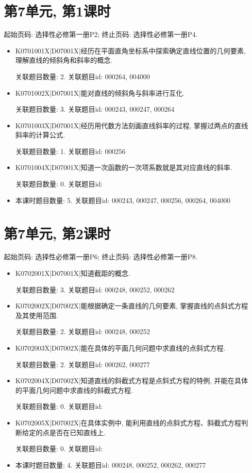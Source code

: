 \section*{第7单元, 第1课时}
起始页码: 选择性必修第一册P2; 终止页码: 选择性必修第一册P4.
\begin{itemize}
\item K0701001X|D07001X|经历在平面直角坐标系中探索确定直线位置的几何要素, 理解直线的倾斜角和斜率的概念.

关联题目数量: 2. 关联题目id: 000264, 004000

\item K0701002X|D07001X|能对直线的倾斜角与斜率进行互化.

关联题目数量: 3. 关联题目id: 000243, 000247, 000264

\item K0701003X|D07001X|经历用代数方法刻画直线斜率的过程, 掌握过两点的直线斜率的计算公式.

关联题目数量: 1. 关联题目id: 000256

\item K0701004X|D07001X|知道一次函数的一次项系数就是其对应直线的斜率.

关联题目数量: 0. 关联题目id: 

\item 本课时题目数量: 5. 关联题目id: 000243, 000247, 000256, 000264, 004000

\end{itemize}

\section*{第7单元, 第2课时}
起始页码: 选择性必修第一册P6; 终止页码: 选择性必修第一册P8.
\begin{itemize}
\item K0702001X|D07001X|知道截距的概念.

关联题目数量: 3. 关联题目id: 000248, 000252, 000262

\item K0702002X|D07002X|能根据确定一条直线的几何要素, 掌握直线的点斜式方程及其使用范围.

关联题目数量: 2. 关联题目id: 000248, 000252

\item K0702003X|D07002X|能在具体的平面几何问题中求直线的点斜式方程.

关联题目数量: 2. 关联题目id: 000262, 000277

\item K0702004X|D07002X|知道直线的斜截式方程是点斜式方程的特例, 并能在具体的平面几何问题中求直线的斜截式方程.

关联题目数量: 0. 关联题目id: 

\item K0702005X|D07002X|在具体实例中, 能利用直线的点斜式方程、斜截式方程判断给定的点是否在已知直线上.

关联题目数量: 0. 关联题目id: 

\item 本课时题目数量: 4. 关联题目id: 000248, 000252, 000262, 000277

\end{itemize}

